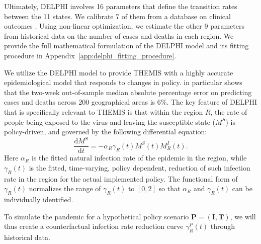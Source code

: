 \documentclass[msom,blindrev]{informs3} %
\renewcommand{\d}{\mathrm{d}}
\begin{document}
Ultimately, DELPHI involves 16 parameters that define the transition rates between the 11 states. We calibrate 7 of them from a database on clinical outcomes . Using non-linear optimization, we estimate the other 9 parameters from historical data on the number of cases and deaths in each region. We provide the full mathematical formulation of the DELPHI model and its fitting procedure in Appendix~\ref{app:delphi_fitting_procedure}. 

We utilize the DELPHI model to provide THEMIS with a highly accurate epidemiological model that responds to changes in policy.  in particular shows that the two-week out-of-sample median absolute percentage error on predicting cases and deaths across 200 geographical areas is $6\%$. The key feature of DELPHI that is specifically relevant to THEMIS is that within the region $R$, the rate of people being exposed to the virus and leaving the susceptible state ($M^{S}$) is policy-driven, and governed by the following differential equation:
\begin{equation}
    \frac{\d M^{S}}{\d t} = -\alpha_R \gamma_R(t) M^S(t)M^I_R(t).\label{eq:S}
\end{equation}
Here $\alpha_R$ is the fitted natural infection rate of the epidemic in the region, while $\gamma_R(t)$ is the fitted, time-varying, policy dependent, reduction of such infection rate in the region for the actual implemented policy. The functional form of $\gamma_R(t)$ normalizes the range of $\gamma_R(t)$ to $[0,2]$ so that $\alpha_R$ and $\gamma_R(t)$ can be individually identified.

To simulate the pandemic for a hypothetical policy scenario $\bm{P}=(\bm{I},\bm{T})$, we will thus create a counterfactual infection rate reduction curve $\gamma_R^P(t)$ through historical data. 
\end{document}
